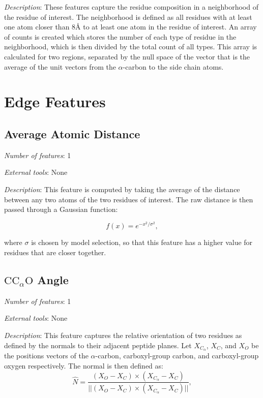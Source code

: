 \noindent
\emph{Description}:
These features capture the residue composition in a neighborhood of the residue of interest.
The neighborhood is defined as all residues with at least one atom closer than 8\AA{} to at least one atom in the residue of interest.
An array of counts is created which stores the number of each type of residue in the neighborhood, which is then divided by the total count of all types.
This array is calculated for two regions, separated by the null space of the vector that is the average of the unit vectors from the $\alpha$-carbon to the side chain atoms.


\section{Edge Features}

\subsection{Average Atomic Distance}
\noindent
\emph{Number of features}: 1

\noindent
\emph{External tools}: None

\noindent
\emph{Description}:
This feature is computed by taking the average of the distance between any two atoms of the two residues of interest.
The raw distance is then passed through a Gaussian function: 

\begin{equation}
f(x) = e^{-x^2 / \sigma^2},
\end{equation}

\noindent
where $\sigma$ is chosen by model selection, so that this feature has a higher value for residues that are closer together.


\subsection{$\text{CC}_{\alpha} \text{O}$ Angle}
\noindent
\emph{Number of features}: 1

\noindent
\emph{External tools}: None

\noindent
\emph{Description}:
This feature captures the relative orientation of two residues as defined by the normals to their adjacent peptide planes.
Let $X_{C_{\alpha}}$, $X_{C}$, and $X_{O}$ be the positions vectors of the $\alpha$-carbon, carboxyl-group carbon, and carboxyl-group oxygen respectively.
The normal is then defined as:
\begin{equation}
\hat{N} = \frac{(X_{O} - X_{C}) \times  (X_{C_\alpha} - X_{C})}{||(X_{O} - X_{C}) \times  (X_{C_\alpha} - X_{C})||}, 
\end{equation}


